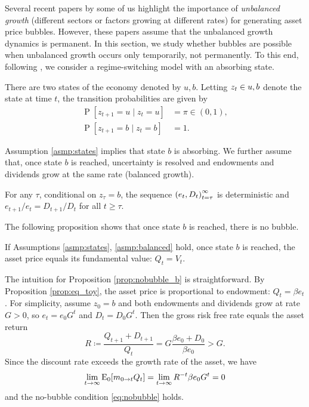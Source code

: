 \documentclass[a4paper,12pt]{article}
\renewcommand{\Pr}{\operatorname{P}}
\numberwithin{equation}{section}
\theoremstyle{plain}
\begin{document}
Several recent papers by some of us \citep{HiranoToda2024JME,HiranoToda2025JPE,HiranoToda2025PNAS} highlight the importance of \emph{unbalanced growth} (different sectors or factors growing at different rates) for generating asset price bubbles. However, these papers assume that the unbalanced growth dynamics is permanent. In this section, we study whether bubbles are possible when unbalanced growth occurs only temporarily, not permanently. To this end, following \citet{Weil1987}, we consider a regime-switching model with an absorbing state.

\begin{asmp}\label{asmp:states}
There are two states of the economy denoted by $u,b$. Letting $z_t\in \set{u,b}$ denote the state at time $t$, the transition probabilities are given by
\begin{align*}
    \Pr[z_{t+1}=u \mid z_t=u] &=\pi \in (0,1), \\
    \Pr[z_{t+1}=b \mid z_t=b] &=1.
\end{align*}
\end{asmp}

Assumption \ref{asmp:states} implies that state $b$ is absorbing. We further assume that, once state $b$ is reached, uncertainty is resolved and endowments and dividends grow at the same rate (balanced growth).

\begin{asmp}\label{asmp:balanced}
For any $\tau$, conditional on $z_\tau=b$, the sequence $\set{(e_t,D_t)}_{t=\tau}^\infty$ is deterministic and $e_{t+1}/e_t=D_{t+1}/D_t$ for all $t\ge \tau$.
\end{asmp}

The following proposition shows that once state $b$ is reached, there is no bubble.

\begin{prop}\label{prop:nobubble_b}
If Assumptions \ref{asmp:states}, \ref{asmp:balanced} hold, once state $b$ is reached, the asset price equals its fundamental value: $Q_t=V_t$.
\end{prop}

The intuition for Proposition \ref{prop:nobubble_b} is straightforward. By Proposition \ref{prop:eq_toy}, the asset price is proportional to endowment: $Q_t=\beta e_t$. For simplicity, assume $z_0=b$ and both endowments and dividends grow at rate $G>0$, so $e_t=e_0G^t$ and $D_t=D_0G^t$. Then the gross risk free rate equals the asset return
\begin{equation*}
    R\coloneqq \frac{Q_{t+1}+D_{t+1}}{Q_t}=G\frac{\beta e_0+D_0}{\beta e_0}>G.
\end{equation*}
Since the discount rate exceeds the growth rate of the asset, we have
\begin{equation*}
    \lim_{t\to\infty} \operatorname{E}_0[m_{0\to t}Q_t]=\lim_{t\to\infty}R^{-t}\beta e_0G^t=0
\end{equation*}
and the no-bubble condition \eqref{eq:nobubble} holds.
\end{document}
